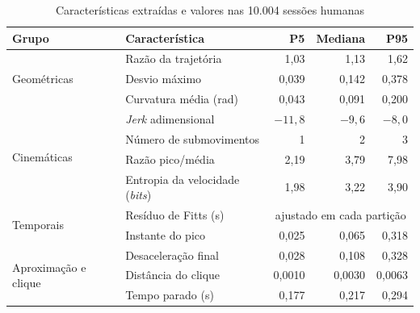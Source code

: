 \begin{table}[htbp]
\centering
\caption{Características extraídas e valores nas 10.004 sessões humanas}
\label{tab:caracteristicas}
\begin{tabular}{llrrr}
\hline
Grupo & Característica & P5 & Mediana & P95 \\
\hline
\multirow{3}{*}{Geométricas}
 & Razão da trajetória         & 1,03   & 1,13   & 1,62 \\
 & Desvio máximo               & 0,039  & 0,142  & 0,378 \\
 & Curvatura média (rad)       & 0,043  & 0,091  & 0,200 \\
\hline
\multirow{4}{*}{Cinemáticas}
 & \textit{Jerk} adimensional  & $-11,8$ & $-9,6$ & $-8,0$ \\
 & Número de submovimentos     & 1      & 2      & 3 \\
 & Razão pico/média            & 2,19   & 3,79   & 7,98 \\
 & Entropia da velocidade (\textit{bits}) & 1,98   & 3,22   & 3,90 \\
\hline
\multirow{2}{*}{Temporais}
 & Resíduo de Fitts (s)        & \multicolumn{3}{c}{ajustado em cada partição} \\
 & Instante do pico            & 0,025  & 0,065  & 0,318 \\
\hline
\multirow{3}{*}{Aproximação e clique}
 & Desaceleração final         & 0,028  & 0,108  & 0,328 \\
 & Distância do clique         & 0,0010 & 0,0030 & 0,0063 \\
 & Tempo parado (s)            & 0,177  & 0,217  & 0,294 \\
\hline
\end{tabular}
\end{table}
